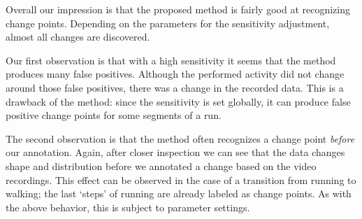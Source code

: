Overall our impression is that the proposed method is fairly good at recognizing change points.
Depending on the parameters for the sensitivity adjustment, almost all changes are discovered.

Our first observation is that with a high sensitivity it seems that the method produces many false positives.
Although the performed activity did not change around those false positives, there was a change in the recorded data.
This is a drawback of the method: since the sensitivity is set globally, it can produce false positive change points for some segments of a run.

The second observation is that the method often recognizes a change point \emph{before} our annotation.
Again, after closer inspection we can see that the data changes shape and distribution before we annotated a change based on the video recordings.
This effect can be observed in the case of a transition from running to walking; the last `steps' of running are already labeled as change points.
As with the above behavior, this is subject to parameter settings.

